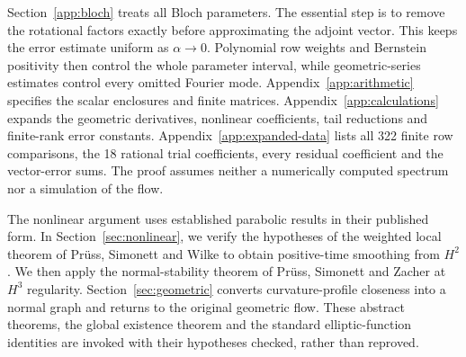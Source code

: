 Section~\ref{app:bloch} treats all Bloch parameters. The essential step is to remove the rotational factors exactly before approximating the adjoint vector. This keeps the error estimate uniform as $\alpha\to0$. Polynomial row weights and Bernstein positivity then control the whole parameter interval, while geometric-series estimates control every omitted Fourier mode. Appendix~\ref{app:arithmetic} specifies the scalar enclosures and finite matrices. Appendix~\ref{app:calculations} expands the geometric derivatives, nonlinear coefficients, tail reductions and finite-rank error constants. Appendix~\ref{app:expanded-data} lists all 322 finite row comparisons, the 18 rational trial coefficients, every residual coefficient and the vector-error sums. The proof assumes neither a numerically computed spectrum nor a simulation of the flow.

The nonlinear argument uses established parabolic results in their published form. In Section~\ref{sec:nonlinear}, we verify the hypotheses of the weighted local theorem of Pr\"uss, Simonett and Wilke \cite[Theorem~1.2]{PSW} to obtain positive-time smoothing from $H^2$. We then apply the normal-stability theorem of Pr\"uss, Simonett and Zacher \cite[Theorem~2.1]{PSZ} at $H^3$ regularity. Section~\ref{sec:geometric} converts curvature-profile closeness into a normal graph and returns to the original geometric flow. These abstract theorems, the global existence theorem and the standard elliptic-function identities are invoked with their hypotheses checked, rather than reproved.
